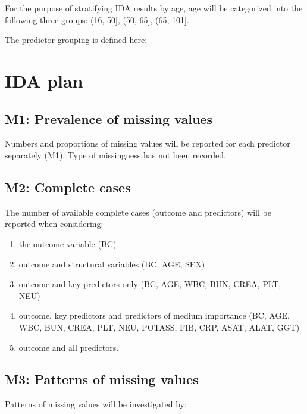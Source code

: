 \documentclass[
  letterpaper,
  DIV=11,
  numbers=noendperiod]{scrreport}
\providecommand{\tightlist}{%
  \setlength{\itemsep}{0pt}\setlength{\parskip}{0pt}}\usepackage{longtable,booktabs,array}
\begin{document}
For the purpose of stratifying IDA results by age, age will be
categorized into the following three groups: (16, 50{]}, (50, 65{]},
(65, 101{]}.

The predictor grouping is defined here:

\hypertarget{ida-plan}{%
\section{IDA plan}\label{ida-plan}}

\hypertarget{m1-prevalence-of-missing-values}{%
\subsection{M1: Prevalence of missing
values}\label{m1-prevalence-of-missing-values}}

Numbers and proportions of missing values will be reported for each
predictor separately (M1). Type of missingness has not been recorded.

\hypertarget{m2-complete-cases}{%
\subsection{M2: Complete cases}\label{m2-complete-cases}}

The number of available complete cases (outcome and predictors) will be
reported when considering:

\begin{enumerate}
\def\labelenumi{\arabic{enumi}.}
\tightlist
\item
  the outcome variable (BC)
\item
  outcome and structural variables (BC, AGE, SEX)
\item
  outcome and key predictors only (BC, AGE, WBC, BUN, CREA, PLT, NEU)
\item
  outcome, key predictors and predictors of medium importance (BC, AGE,
  WBC, BUN, CREA, PLT, NEU, POTASS, FIB, CRP, ASAT, ALAT, GGT)
\item
  outcome and all predictors.
\end{enumerate}

\hypertarget{m3-patterns-of-missing-values}{%
\subsection{M3: Patterns of missing
values}\label{m3-patterns-of-missing-values}}

Patterns of missing values will be investigated by:
\end{document}
